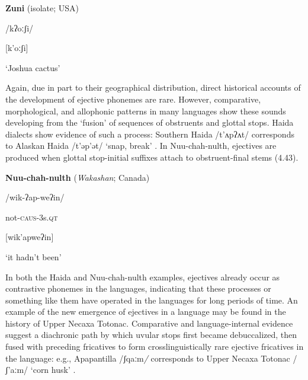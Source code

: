 \ea\label{ex:(4.42)}
  \textbf{Zuni} (isolate; USA)



/kʔoːʃi/



[k’oːʃi]



‘Joshua cactus’



\citep[16]{Newman1965}

\z


  Again, due in part to their geographical distribution, direct historical accounts of the development of ejective phonemes are rare. However, comparative, morphological, and allophonic patterns in many languages show these sounds developing from the ‘fusion’ of sequences of obstruents and glottal stops. Haida dialects show evidence of such a process: Southern Haida /t’ʌpʔʌt/ corresponds to Alaskan Haida /t’əp’ət/ ‘snap, break’ \citep[312]{Fallon2002}. In Nuu-chah-nulth, ejectives are produced when glottal stop-initial suffixes attach to obstruent-final stems (4.43).



\ea\label{ex:(4.43)}
  \textbf{Nuu-chah-nulth} (\textit{Wakashan}; Canada)



/wik{}-ʔap{}-weʔin/



not-\textsc{caus}{}-3s.\textsc{qt}



[wik’apweʔin]



‘it hadn’t been’



\citep[69]{Stonham1999}
\z



  In both the Haida and Nuu-chah-nulth examples, ejectives already occur as contrastive phonemes in the languages, indicating that these processes or something like them have operated in the languages for long periods of time. An example of the new emergence of ejectives in a language may be found in the history of Upper Necaxa Totonac. Comparative and language-internal evidence suggest a diachronic path by which uvular stops first became debuccalized, then fused with preceding fricatives to form crosslinguistically rare ejective fricatives in the language: e.g., Apapantilla /ʃqaːm\textit{/} corresponds to Upper Necaxa Totonac /ʃ’aːm/ ‘corn husk’ \citep[6]{Beck2006}.



